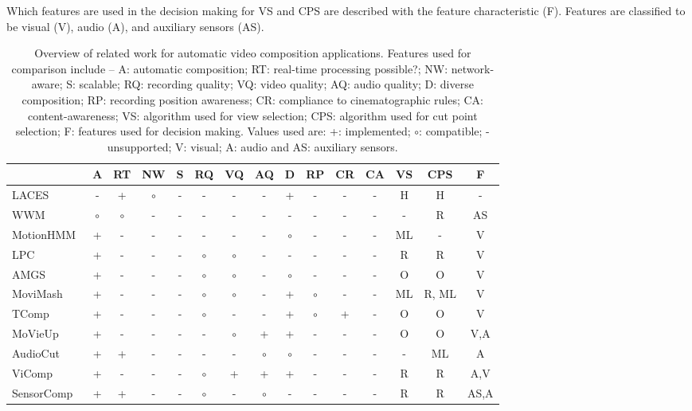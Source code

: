 Which features are used in the decision making for VS and CPS are described with the feature characteristic (F).
Features are classified to be visual (V), audio (A), and auxiliary sensors (AS).  
\begin{table}
	\centering
	\caption[Comparison of existing video composition systems]{Overview of related work for automatic video composition applications. Features used for comparison include -- A: automatic composition; RT: real-time processing possible?; NW: network-aware; S: scalable; RQ: recording quality; VQ: video quality; AQ: audio quality; D: diverse composition; RP: recording position awareness; CR: compliance to cinematographic rules; CA: content-awareness; VS: algorithm used for view selection; CPS: algorithm used for cut point selection; F: features used for decision making. Values used are: +: implemented; $\circ$: compatible; - unsupported; V: visual; A: audio and AS: auxiliary sensors.}
	\begin{tabular}{lcccccccccccccc}
		\toprule[1.5pt]
		&  \textbf{A}  & \textbf{RT} & \textbf{NW} & \textbf{S} & \textbf{RQ} &\textbf{VQ} &\textbf{AQ} &\textbf{D} &\textbf{RP} & \textbf{CR} & \textbf{CA} &\textbf{VS} &\textbf{CPS} &\textbf{F}  \\ 
		\toprule[1.5pt]
		LACES~\cite{Freeman2014}  	& - & + & $\circ$ & -& - &-  & - & +& -& -& - & H & H & - \\
		WWM~\cite{Vihavainen2011} 	& $\circ$ & $\circ$ & - & - & - &-  & - & -& -& -& - & - & R & AS \\
		MotionHMM~\cite{Wang2008} 	& +  & - & - &- &-  &-  &-  &$\circ$ &- &- &-  &ML  &  -&V  \\
		LPC~\cite{Campanella2007} 	& + & - & - &  -& $\circ$ & $\circ$ & -& -&- & - &-  & R & R & V \\
		AMGS~\cite{Shrestha2010}    &  +& - & - &- &$\circ$& $\circ$ & - & $\circ$ & -& - & - & O & O &V  \\
		MoviMash~\cite{Saini2012} 	& + & - &-  & - & $\circ$ & $\circ$ & - & +& $\circ$& -& - & ML & R, ML & V  \\
		TComp~\cite{Arev2014} 		& + &-  &-  & -& $\circ$ & - & - & +& $\circ$& +& - & O & O &V  \\
		MoVieUp~\cite{Wu2015} 		& + &-  &-  &- &-  &$\circ$  & + & +& -& -& - & O  & O  & V,A  \\
		AudioCut~\cite{Roininen2016}& + & + & - & -&  -& - & $\circ$ & $\circ$ & - & -& - & - & ML & A  \\
		ViComp~\cite{Bano2015b} 	& + & - & - & - & $\circ$ & + & + &+ &- & - & - & R  & R & A,V \\
		SensorComp~\cite{Cricri2012} & + & + & - & - & $\circ$ & - & $\circ$ & - & - &- & - & R &  R&  AS,A\\
		\bottomrule[1.5pt]
	\end{tabular} 
	\label{tab:240_Related_Work}
\end{table}
